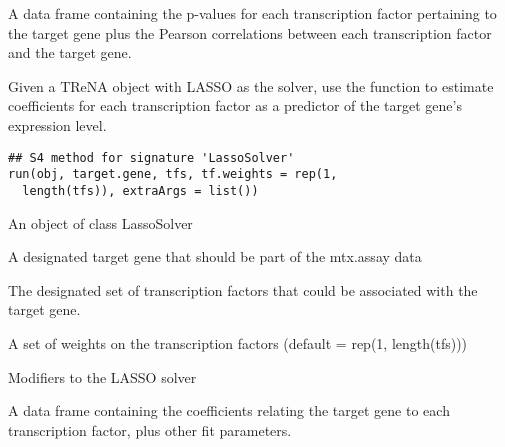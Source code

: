 \documentclass[a4paper]{book}
\begin{document}
%
\begin{Value}
A data frame containing the p-values for each transcription factor pertaining to the target gene
plus the Pearson correlations between each transcription factor and the target gene.
\end{Value}
%
\begin{SeeAlso}\relax
{}
\end{SeeAlso}
%
\begin{Description}\relax
Given a TReNA object with LASSO as the solver, use the  function to estimate coefficients
for each transcription factor as a predictor of the target gene's expression level.
\end{Description}
%
\begin{Usage}
\begin{verbatim}
## S4 method for signature 'LassoSolver'
run(obj, target.gene, tfs, tf.weights = rep(1,
  length(tfs)), extraArgs = list())
\end{verbatim}
\end{Usage}
%
\begin{Arguments}
\begin{ldescription}
\item[\code{obj}] An object of class LassoSolver

\item[\code{target.gene}] A designated target gene that should be part of the mtx.assay data

\item[\code{tfs}] The designated set of transcription factors that could be associated with the target gene.

\item[\code{tf.weights}] A set of weights on the transcription factors (default = rep(1, length(tfs)))

\item[\code{extraArgs}] Modifiers to the LASSO solver
\end{ldescription}
\end{Arguments}
%
\begin{Value}
A data frame containing the coefficients relating the target gene to each transcription factor, plus other fit parameters.
\end{Value}
%
\begin{SeeAlso}\relax
{}
\end{SeeAlso}
\end{document}
